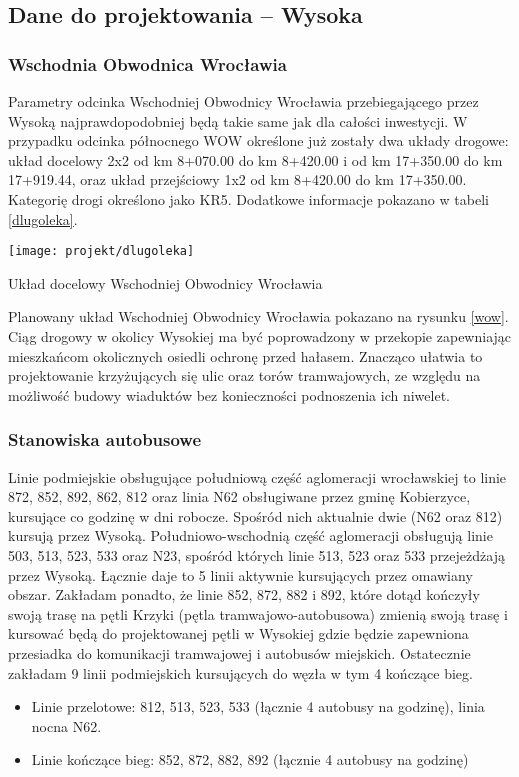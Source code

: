 \documentclass[twoside,12pt]{article}
\begin{document}
\subsection{Dane do projektowania -- Wysoka}

	\subsubsection{Wschodnia Obwodnica Wrocławia}
	
	Parametry odcinka Wschodniej Obwodnicy Wrocławia przebiegającego przez Wysoką najprawdopodobniej będą takie same jak dla całości inwestycji. W przypadku odcinka północnego WOW określone już zostały dwa układy drogowe: układ docelowy 2x2 od km 8+070.00 do km 8+420.00 i od km 17+350.00 do km 17+919.44, oraz układ przejściowy 1x2 od km 8+420.00 do km 17+350.00. Kategorię drogi określono jako KR5. Dodatkowe informacje pokazano w tabeli \ref{dlugoleka}.
	
	\begin{table}[H]
		\centering
		\texttt{[image: projekt/dlugoleka]}
		\caption{Układ docelowy Wschodniej Obwodnicy Wrocławia}
		\label{dlugoleka}
	\end{table}
	
	Planowany układ Wschodniej Obwodnicy Wrocławia pokazano na rysunku \ref{wow}. Ciąg drogowy w okolicy Wysokiej ma być poprowadzony w przekopie zapewniając mieszkańcom okolicznych osiedli ochronę przed hałasem. Znacząco ułatwia to projektowanie krzyżujących się ulic oraz torów tramwajowych, ze względu na możliwość budowy wiaduktów bez konieczności podnoszenia ich niwelet.

	\subsubsection{Stanowiska autobusowe}
	
	Linie podmiejskie obsługujące południową część aglomeracji wrocławskiej to linie 872, 852, 892, 862, 812 oraz linia N62 obsługiwane przez gminę Kobierzyce, kursujące co godzinę w dni robocze. Spośród nich aktualnie dwie (N62 oraz 812) kursują przez Wysoką. Południowo-wschodnią część aglomeracji obsługują linie 503, 513, 523, 533 oraz N23, spośród których linie 513, 523 oraz 533 przejeżdżają przez Wysoką. Łącznie daje to 5 linii aktywnie kursujących przez omawiany obszar. Zakładam ponadto, że linie 852, 872, 882 i 892, które dotąd kończyły swoją trasę na pętli Krzyki (pętla tramwajowo-autobusowa) zmienią swoją trasę i kursować będą do projektowanej pętli w Wysokiej gdzie będzie zapewniona przesiadka do komunikacji tramwajowej i autobusów miejskich. Ostatecznie zakładam 9 linii podmiejskich kursujących do węzła w tym 4 kończące bieg.
	\begin{itemize}
	\item Linie przelotowe: 812, 513, 523, 533 (łącznie 4 autobusy na godzinę), linia nocna N62.
	\item Linie kończące bieg: 852, 872, 882, 892 (łącznie 4 autobusy na godzinę)
	\end{itemize}
	
\end{document}
